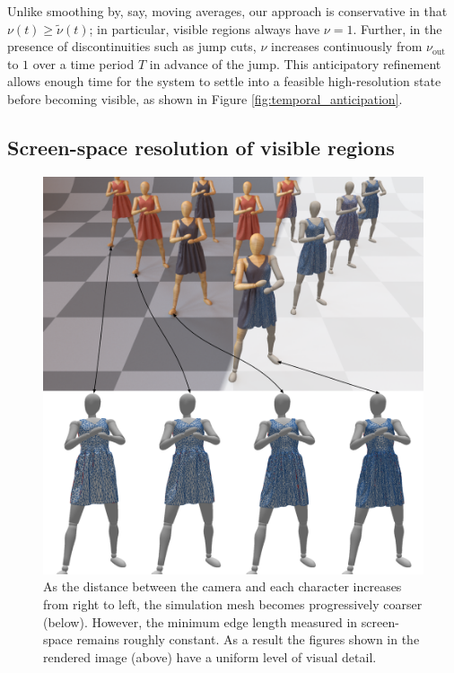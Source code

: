 \documentclass[10pt,journal,compsoc,twoside]{TexInputs/IEEEtran}
\begin{document}
Unlike smoothing by, say, moving averages, our approach is conservative in that $\nu(t) \ge \tilde\nu(t)$; in particular, visible regions always have $\nu = 1$.
Further, in the presence of discontinuities such as jump cuts, $\nu$ increases continuously from $\nu_{\text{out}}$ to $1$ over a time period $T$ in advance of the jump.
This anticipatory refinement allows enough time for the system to settle into a feasible high-resolution state before becoming visible, as shown in Figure \ref{fig:temporal_anticipation}.

\subsection{Screen-space resolution of visible regions}

\begin{figure}[t]
    \centering
    \includegraphics[width=1.0\columnwidth]{screen-space_resizing/screen-space_resizing.pdf}
    \caption{As the distance between the camera and each
    character increases from right to left, the simulation mesh becomes progressively coarser (below).
  However, the minimum edge length measured in screen-space remains roughly constant.  As a result the 
  figures shown in the rendered image (above) have a uniform level of visual detail.
  }
    \label{fig:screen-space_resizing}
\end{figure}
\end{document}

